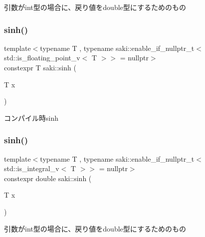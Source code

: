 引数がint型の場合に、戻り値をdouble型にするためのもの 

\mbox{\label{namespacesaki_abe1ef6db83d59a5eb2daac9bff09d312}} 
\subsubsection{\texorpdfstring{sinh()}{sinh()}\hspace{0.1cm}{\footnotesize\ttfamily [1/2]}}
{\footnotesize\ttfamily template$<$typename T , typename saki\+::enable\+\_\+if\+\_\+nullptr\+\_\+t$<$ std\+::is\+\_\+floating\+\_\+point\+\_\+v$<$ T $>$$>$  = nullptr$>$ \\
constexpr T saki\+::sinh (\begin{DoxyParamCaption}\item[{T}]{x }\end{DoxyParamCaption})}



コンパイル時sinh 

\mbox{\label{namespacesaki_a8199390b7650fdebe491aaeb4c3a44c3}} 
\subsubsection{\texorpdfstring{sinh()}{sinh()}\hspace{0.1cm}{\footnotesize\ttfamily [2/2]}}
{\footnotesize\ttfamily template$<$typename T , typename saki\+::enable\+\_\+if\+\_\+nullptr\+\_\+t$<$ std\+::is\+\_\+integral\+\_\+v$<$ T $>$$>$  = nullptr$>$ \\
constexpr double saki\+::sinh (\begin{DoxyParamCaption}\item[{T}]{x }\end{DoxyParamCaption})}



引数がint型の場合に、戻り値をdouble型にするためのもの 

\mbox{\label{namespacesaki_ad15185db28f6e77d65411ca83f64f5bb}} 
